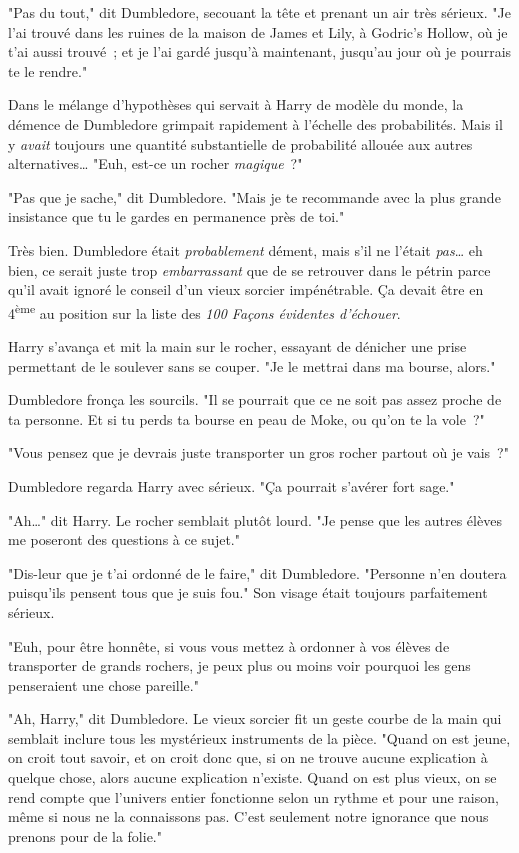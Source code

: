 "Pas du tout," dit Dumbledore, secouant la tête et prenant un air très sérieux. "Je l'ai trouvé dans les ruines de la maison de James et Lily, à Godric's Hollow, où je t'ai aussi trouvé~; et je l'ai gardé jusqu'à maintenant, jusqu'au jour où je pourrais te le rendre."

Dans le mélange d'hypothèses qui servait à Harry de modèle du monde, la démence de Dumbledore grimpait rapidement à l'échelle des probabilités. Mais il y \emph{avait} toujours une quantité substantielle de probabilité allouée aux autres alternatives… "Euh, est-ce un rocher \emph{magique}~?"

"Pas que je sache," dit Dumbledore. "Mais je te recommande avec la plus grande insistance que tu le gardes en permanence près de toi."

Très bien. Dumbledore était \emph{probablement} dément, mais s'il ne l'était \emph{pas}… eh bien, ce serait juste trop \emph{embarrassant} que de se retrouver dans le pétrin parce qu'il avait ignoré le conseil d'un vieux sorcier impénétrable. Ça devait être en 4\textsuperscript{ème} au position sur la liste des \emph{100 Façons évidentes d'échouer}.

Harry s'avança et mit la main sur le rocher, essayant de dénicher une prise permettant de le soulever sans se couper. "Je le mettrai dans ma bourse, alors."

Dumbledore fronça les sourcils. "Il se pourrait que ce ne soit pas assez proche de ta personne. Et si tu perds ta bourse en peau de Moke, ou qu'on te la vole~?"

"Vous pensez que je devrais juste transporter un gros rocher partout où je vais~?"

Dumbledore regarda Harry avec sérieux. "Ça pourrait s'avérer fort sage."

"Ah…" dit Harry. Le rocher semblait plutôt lourd. "Je pense que les autres élèves me poseront des questions à ce sujet."

"Dis-leur que je t'ai ordonné de le faire," dit Dumbledore. "Personne n'en doutera puisqu'ils pensent tous que je suis fou." Son visage était toujours parfaitement sérieux.

"Euh, pour être honnête, si vous vous mettez à ordonner à vos élèves de transporter de grands rochers, je peux plus ou moins voir pourquoi les gens penseraient une chose pareille."

"Ah, Harry," dit Dumbledore. Le vieux sorcier fit un geste courbe de la main qui semblait inclure tous les mystérieux instruments de la pièce. "Quand on est jeune, on croit tout savoir, et on croit donc que, si on ne trouve aucune explication à quelque chose, alors aucune explication n'existe. Quand on est plus vieux, on se rend compte que l'univers entier fonctionne selon un rythme et pour une raison, même si nous ne la connaissons pas. C'est seulement notre ignorance que nous prenons pour de la folie."

